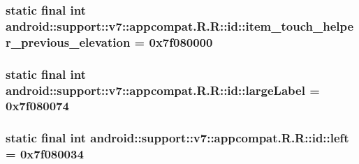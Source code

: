 \hypertarget{classandroid_1_1support_1_1v7_1_1appcompat_1_1_r_1_1id_b051073d9f1accc96e36f902b653a97b}{
\subsubsection[{item\_\-touch\_\-helper\_\-previous\_\-elevation}]{\setlength{\rightskip}{0pt plus 5cm}static final int android::support::v7::appcompat.R.R::id::item\_\-touch\_\-helper\_\-previous\_\-elevation = 0x7f080000}}
\label{classandroid_1_1support_1_1v7_1_1appcompat_1_1_r_1_1id_b051073d9f1accc96e36f902b653a97b}


\hypertarget{classandroid_1_1support_1_1v7_1_1appcompat_1_1_r_1_1id_37c73c636fbbd95f8f26991da40fe21e}{
\subsubsection[{largeLabel}]{\setlength{\rightskip}{0pt plus 5cm}static final int android::support::v7::appcompat.R.R::id::largeLabel = 0x7f080074}}
\label{classandroid_1_1support_1_1v7_1_1appcompat_1_1_r_1_1id_37c73c636fbbd95f8f26991da40fe21e}


\hypertarget{classandroid_1_1support_1_1v7_1_1appcompat_1_1_r_1_1id_910bb1db54155d45f3439a2139d1b55f}{
\subsubsection[{left}]{\setlength{\rightskip}{0pt plus 5cm}static final int android::support::v7::appcompat.R.R::id::left = 0x7f080034}}
\label{classandroid_1_1support_1_1v7_1_1appcompat_1_1_r_1_1id_910bb1db54155d45f3439a2139d1b55f}


